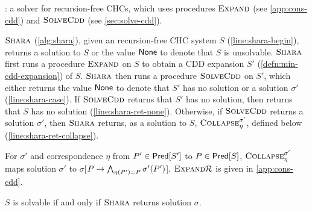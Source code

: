 \begin{algorithm}[t]
  \caption{\sys: a solver for recursion-free CHCs, which uses
    procedures $\textsc{Expand}{}$ (see \autoref{app:cons-cdd}) and
    $\textsc{SolveCdd}$ (see
    \autoref{sec:solve-cdd}). }
  \label{alg:shara}
\end{algorithm}
$\textsc{Shara}$ (\autoref{alg:shara}), given an recursion-free CHC system $S$ (\autoref{line:shara-begin}), 
returns a solution
to $S$ or the value $\mathsf{None}$ to denote that $S$ is
unsolvable.
%
$\textsc{Shara}$ first runs a procedure $\textsc{Expand}{}$ on $S$ to obtain a CDD expansion $S'$ (\autoref{defn:min-cdd-expansion})
of $S$.
%
$\textsc{Shara}$ then runs a procedure $\textsc{SolveCdd}$ on $S'$, which either returns the value
$\mathsf{None}$ to denote that $S'$ has no solution or a solution
$\sigma'$ (\autoref{line:shara-case}).
%
If $\textsc{SolveCdd}$ returns that $S'$ has
no solution, then \sys returns that $S$ has no solution
(\autoref{line:shara-ret-none}).
%
Otherwise, if $\textsc{SolveCdd}$ returns a solution
$\sigma'$, then $\mbox{\textsc{Shara}}$ returns, as a solution to $S$,
$\textsc{Collapse}_{ \eta }^{ \sigma' }$, defined below
(\autoref{line:shara-ret-collapse}).

For $\sigma'$ and %
correspondence $\eta$ from $P' \in \mathsf{Pred}[ S' ]$ to $P \in \mathsf{Pred}[ S ]$,
$\textsc{Collapse}_{\eta}^{\sigma'}$ maps solution $\sigma'$ to
$\sigma$[$P \to \bigwedge_{ \eta(P') = P}
\sigma'(P')$].
%
$\textsc{Expand}{ \mathcal{R} }$ is given in \autoref{app:cons-cdd}.

\begin{thm}
  \label{thm:corr}
  $S$ is solvable if and only if $\textsc{Shara}$ returns solution $\sigma$.
\end{thm}

